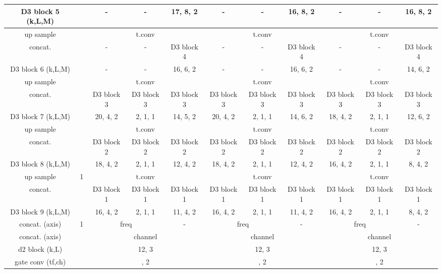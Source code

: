 \documentclass[final]{cvpr}
\begin{document}
\begin{table*}[t]
{\begin{tabular}{ c | c | c | c | c | c | c | c | c | c | c}
        \cline{3-11}
        D3 block 5 (k,L,M) & & - & - & 17, 8, 2 &  - & - & 16, 8, 2 & - & - & 16, 8, 2 \\
        \hline
        up sample  & \multirow{3}{*}{} & \multicolumn{3}{c|}{t.conv } &  \multicolumn{3}{c|}{t.conv } & \multicolumn{3}{c}{t.conv } \\
        \cline{3-11}
        concat. & & - & - & D3 block 4 & - & - & D3 block 4 & - & - & D3 block 4 \\
        D3 block 6 (k,L,M) & & -& - & 16, 6, 2& -& - & 16, 6, 2& -& - & 14, 6, 2 \\
		\hline
        up sample  & \multirow{3}{*}{} & \multicolumn{3}{c|}{t.conv } &  \multicolumn{3}{c|}{t.conv } & \multicolumn{3}{c}{t.conv } \\
        \cline{3-11}
        concat. & & D3 block 3 & D3 block 3 & D3 block 3 & D3 block 3 & D3 block 3 & D3 block 3 & D3 block 3 & D3 block 3 & D3 block 3\\
        D3 block 7 (k,L,M) & & 20, 4, 2& 2, 1, 1 & 14, 5, 2 & 20, 4, 2& 2, 1, 1 & 14, 6, 2 & 18, 4, 2& 2, 1, 1 & 12, 6, 2\\
		\hline
        up sample  & \multirow{3}{*}{} & \multicolumn{3}{c|}{t.conv } & \multicolumn{3}{c|}{t.conv }  & \multicolumn{3}{c}{t.conv }\\
        \cline{3-11}
        concat. & & D3 block 2 & D3 block 2 & D3 block 2 & D3 block 2 & D3 block 2 & D3 block 2 & D3 block 2 & D3 block 2 & D3 block 2 \\
        D3 block 8 (k,L,M) & & 18, 4, 2 & 2, 1, 1 & 12, 4, 2  & 18, 4, 2 & 2, 1, 1 & 12, 4, 2 & 16, 4, 2 & 2, 1, 1 & 8, 4, 2\\
		\hline
        up sample  & \multirow{3}{*}{1} & \multicolumn{3}{c|}{t.conv } &  \multicolumn{3}{c|}{t.conv }  & \multicolumn{3}{c}{t.conv } \\
        \cline{3-11}
        concat. & & D3 block 1 & D3 block 1 & D3 block 1 & D3 block 1 & D3 block 1 & D3 block 1 & D3 block 1 & D3 block 1 & D3 block 1\\
        D3 block 9 (k,L,M) & & 16, 4, 2 & 2, 1, 1 & 11, 4, 2  & 16, 4, 2 & 2, 1, 1 & 11, 4, 2 & 16, 4, 2 & 2, 1, 1 & 8, 4, 2\\        
        \hline
        concat. (axis) & \multirow{4}{*}{1} & \multicolumn{2}{c|}{freq} & - & \multicolumn{2}{c|}{freq} & - & \multicolumn{2}{c|}{freq} & - \\
        \cline{3-11}
        concat. (axis) &  & \multicolumn{3}{c|}{channel} &  \multicolumn{3}{c|}{channel} & \multicolumn{3}{c}{channel}\\
        \cline{3-11}
        d2 block (k,L) & & \multicolumn{3}{c|}{12, 3} & \multicolumn{3}{c|}{12, 3} & \multicolumn{3}{c}{12, 3} \\   
        \cline{3-11}
        gate conv (tf,ch) &   & \multicolumn{3}{c|}{, 2} &  \multicolumn{3}{c|}{, 2}&  \multicolumn{3}{c}{, 2}\\
        \hline
      \end{tabular}
    }
\end{table*}
\end{document}
